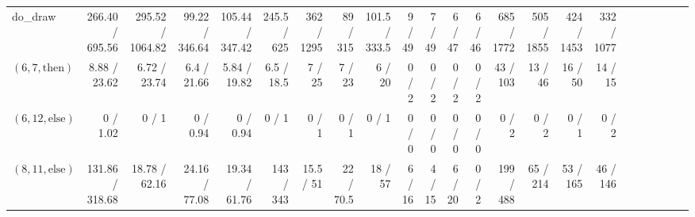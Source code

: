 \documentclass[sigconf]{acmart}
\newcommand{\thenBr}{\text{then}}
\newcommand{\elseBr}{\text{else}}
\begin{document}
\begin{table*}
{\begin{tabular}{l|rrrr|rrrr|rrrr|rrrr|r|r|r|r|r|r}
    \midrule
    \midrule
    do\_draw             & 266.40 / 695.56 & 295.52 / 1064.82 & 99.22 / 346.64 & 105.44 / 347.42 & 245.5 / 625   & 362   / 1295  & 89   / 315  & 101.5 / 333.5  & 9 / 49 & 7 / 49 & 6 / 47 & 6 / 46 & 685 / 1772 & 505 / 1855 & 424 / 1453 & 332 / 1077 & & & & & & \\
    $(6,7,\thenBr)$      & 8.88   / 23.62  & 6.72   / 23.74   & 6.4   / 21.66  & 5.84   / 19.82  & 6.5   / 18.5  & 7     / 25    & 7    / 23   & 6     / 20     & 0 / 2  & 0 / 2  & 0 / 2  & 0 / 2  & 43  / 103  & 13  / 46   & 16  / 50   & 14  / 15   & & & & & & \\
    $(6,12,\elseBr)$     & 0      / 1.02   & 0      / 1       & 0     / 0.94   & 0      / 0.94   & 0     / 1     & 0     / 1     & 0    / 1    & 0     / 1      & 0 / 0  & 0 / 0  & 0 / 0  & 0 / 0  & 0   / 2    & 0   / 2    & 0   / 1    & 0   / 2    & & & & & & \\
    $(8,11,\elseBr)$     & 131.86 / 318.68 & 18.78  / 62.16   & 24.16 / 77.08  & 19.34  / 61.76  & 143   / 343   & 15.5  / 51    & 22   / 70.5 & 18    / 57     & 6 / 16 & 4 / 15 & 6 / 20 & 0 / 2  & 199 / 488  & 65  / 214  & 53  / 165  & 46  / 146  & & & & & &\\

\end{tabular}}
\end{table*}
\end{document}
